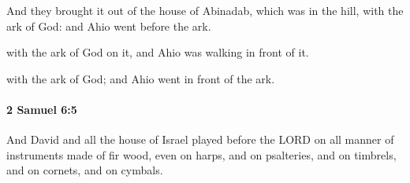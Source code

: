 			\begin{versebox}
					\item[BHS] 
					\item[ASV] And they brought it out of the house of Abinadab, which was in the hill, with the ark of God: and Ahio went before the ark.
					\item[NIV] with the ark of God on it, and Ahio was walking in front of it.
					\item[NRSV] with the ark of God; and Ahio went in front of the ark.
			\end{versebox}

		\paragraph{2 Samuel 6:5} %
			\label{2SAMUEL-6-5}

			And David and all the house of Israel played before the LORD on all manner of instruments made of fir wood, even on harps, and on psalteries, and on timbrels, and on cornets, and on cymbals.

